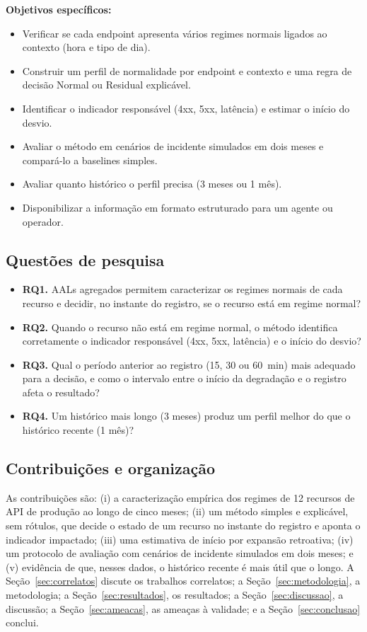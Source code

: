 \documentclass[sigconf,nonacm]{acmart}
\begin{document}
\textbf{Objetivos específicos:}
\begin{itemize}
  \item Verificar se cada endpoint apresenta vários regimes normais ligados ao contexto (hora e tipo de dia).
  \item Construir um perfil de normalidade por endpoint e contexto e uma regra de decisão Normal ou Residual explicável.
  \item Identificar o indicador responsável (4xx, 5xx, latência) e estimar o início do desvio.
  \item Avaliar o método em cenários de incidente simulados em dois meses e compará-lo a baselines simples.
  \item Avaliar quanto histórico o perfil precisa (3 meses ou 1 mês).
  \item Disponibilizar a informação em formato estruturado para um agente ou operador.
\end{itemize}

\subsection{Questões de pesquisa}
\begin{itemize}
  \item \textbf{RQ1.} AALs agregados permitem caracterizar os regimes normais de cada recurso e decidir, no instante do registro, se o recurso está em regime normal?
  \item \textbf{RQ2.} Quando o recurso não está em regime normal, o método identifica corretamente o indicador responsável (4xx, 5xx, latência) e o início do desvio?
  \item \textbf{RQ3.} Qual o período anterior ao registro (15, 30 ou 60~min) mais adequado para a decisão, e como o intervalo entre o início da degradação e o registro afeta o resultado?
  \item \textbf{RQ4.} Um histórico mais longo (3 meses) produz um perfil melhor do que o histórico recente (1 mês)?
\end{itemize}

\subsection{Contribuições e organização}
As contribuições são: (i) a caracterização empírica dos regimes de 12 recursos de API de produção ao longo de cinco meses; (ii) um método simples e explicável, sem rótulos, que decide o estado de um recurso no instante do registro e aponta o indicador impactado; (iii) uma estimativa de início por expansão retroativa; (iv) um protocolo de avaliação com cenários de incidente simulados em dois meses; e (v) evidência de que, nesses dados, o histórico recente é mais útil que o longo. A Seção~\ref{sec:correlatos} discute os trabalhos correlatos; a Seção~\ref{sec:metodologia}, a metodologia; a Seção~\ref{sec:resultados}, os resultados; a Seção~\ref{sec:discussao}, a discussão; a Seção~\ref{sec:ameacas}, as ameaças à validade; e a Seção~\ref{sec:conclusao} conclui.
\end{document}
